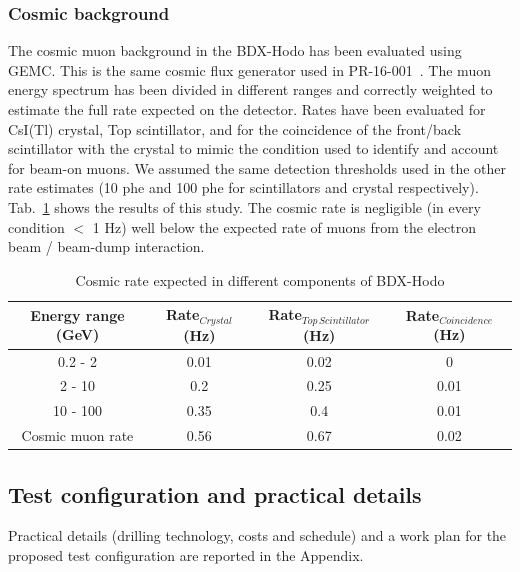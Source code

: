 \subsubsection{Cosmic background}
The cosmic muon background in the BDX-Hodo has been evaluated using GEMC. This is the same cosmic flux generator used in PR-16-001~\cite{bdx-proposal}. The muon energy spectrum has been divided in different ranges  and correctly weighted to estimate the full rate expected on the detector. Rates have been evaluated for CsI(Tl) crystal, Top scintillator,  and for the coincidence of the front/back scintillator with the crystal  to mimic the condition used to identify and account for beam-on muons. We assumed the same detection thresholds used in the other rate estimates (10 phe and 100 phe for scintillators and crystal respectively). Tab.~\ref{tab:cosmic} shows the results of this study. The cosmic rate is negligible (in every condition $<$ 1 Hz) well below the expected rate of muons from the electron beam / beam-dump interaction.

\begin{table}[htp]
\caption{Cosmic rate expected in different components of BDX-Hodo}
\begin{center}
\begin{tabular}{|c|c|c|c|}
\hline
Energy range  (GeV) & Rate$_{Crystal}$  (Hz)&  Rate$_{Top\,Scintillator} $(Hz) & Rate$_{Coincidence}$ (Hz) \\
\hline\hline
 0.2 - 2  & 0.01 &  0.02 & 0\\
 \hline
 2 - 10  & 0.2 &  0.25 & 0.01\\
 \hline
 10 - 100  & 0.35 &  0.4 & 0.01\\
\hline\hline
Cosmic muon rate  & 0.56 &  0.67 & 0.02 \\
\hline\hline
\end{tabular}
\end{center}
\label{tab:cosmic}
\end{table}%

\subsection{Test configuration and practical details}
Practical details (drilling technology, costs and schedule) and a work plan for the proposed test configuration  are reported in the Appendix.

